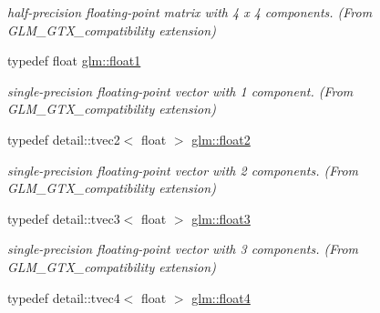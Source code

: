\begin{DoxyCompactItemize}
\begin{DoxyCompactList}\small\item\em half-\/precision floating-\/point matrix with 4 x 4 components. (From G\+L\+M\+\_\+\+G\+T\+X\+\_\+compatibility extension) \end{DoxyCompactList}\item 
\hypertarget{group__gtx__compatibility_gae0ad1b0450320cda98bbbecb56bc3167}{}typedef float \hyperlink{group__gtx__compatibility_gae0ad1b0450320cda98bbbecb56bc3167}{glm\+::float1}\label{group__gtx__compatibility_gae0ad1b0450320cda98bbbecb56bc3167}

\begin{DoxyCompactList}\small\item\em single-\/precision floating-\/point vector with 1 component. (From G\+L\+M\+\_\+\+G\+T\+X\+\_\+compatibility extension) \end{DoxyCompactList}\item 
\hypertarget{group__gtx__compatibility_gaca242c348329306e15f93b59431dfbb7}{}typedef detail\+::tvec2$<$ float $>$ \hyperlink{group__gtx__compatibility_gaca242c348329306e15f93b59431dfbb7}{glm\+::float2}\label{group__gtx__compatibility_gaca242c348329306e15f93b59431dfbb7}

\begin{DoxyCompactList}\small\item\em single-\/precision floating-\/point vector with 2 components. (From G\+L\+M\+\_\+\+G\+T\+X\+\_\+compatibility extension) \end{DoxyCompactList}\item 
\hypertarget{group__gtx__compatibility_gaafe5de8c64428b8da207d34152830ede}{}typedef detail\+::tvec3$<$ float $>$ \hyperlink{group__gtx__compatibility_gaafe5de8c64428b8da207d34152830ede}{glm\+::float3}\label{group__gtx__compatibility_gaafe5de8c64428b8da207d34152830ede}

\begin{DoxyCompactList}\small\item\em single-\/precision floating-\/point vector with 3 components. (From G\+L\+M\+\_\+\+G\+T\+X\+\_\+compatibility extension) \end{DoxyCompactList}\item 
\hypertarget{group__gtx__compatibility_ga5391912827a33b9eaa109ec00a24c625}{}typedef detail\+::tvec4$<$ float $>$ \hyperlink{group__gtx__compatibility_ga5391912827a33b9eaa109ec00a24c625}{glm\+::float4}\label{group__gtx__compatibility_ga5391912827a33b9eaa109ec00a24c625}


\end{DoxyCompactItemize}

